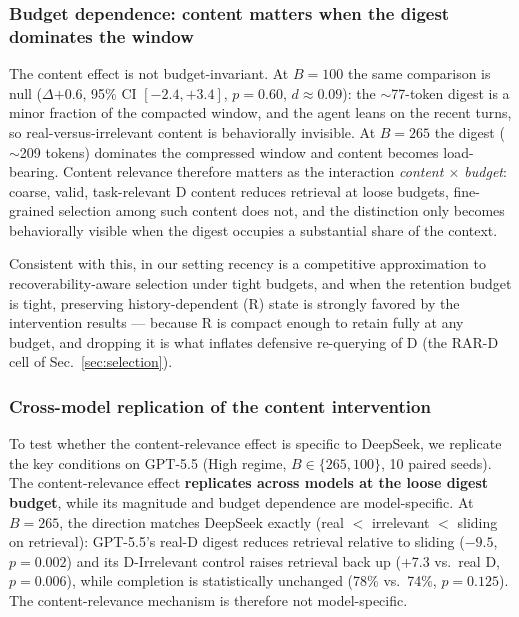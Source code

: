 \documentclass[11pt]{article}
\begin{document}
\subsubsection{Budget dependence: content matters when the digest dominates the window}
\label{sec:budget}

The content effect is not budget-invariant. At $B=100$ the same comparison is
null ($\Delta{+0.6}$, 95\% CI $[-2.4, +3.4]$, $p = 0.60$, $d \approx 0.09$): the $\sim$77-token digest is a
minor fraction of the compacted window, and the agent leans on the recent turns, so
real-versus-irrelevant content is behaviorally invisible. At $B=265$ the digest
($\sim$209 tokens) dominates the compressed window and content becomes load-bearing. Content
relevance therefore matters as the interaction \emph{content $\times$ budget}: coarse, valid,
task-relevant D content reduces retrieval at loose budgets, fine-grained selection among
such content does not, and the distinction only becomes behaviorally visible when the
digest occupies a substantial share of the context.

Consistent with this, in our setting recency is a competitive approximation to
recoverability-aware selection under tight budgets, and when the retention budget is
tight, preserving history-dependent (R) state is strongly favored by the intervention
results --- because R is compact enough to retain fully at any budget, and dropping it is
what inflates defensive re-querying of D (the RAR-D cell of Sec.~\ref{sec:selection}).

\subsubsection{Cross-model replication of the content intervention}
\label{sec:crossmodel}

To test whether the content-relevance effect is specific to DeepSeek, we replicate the
key conditions on GPT-5.5 (High regime, $B \in \{265, 100\}$, 10 paired seeds). The
content-relevance effect \textbf{replicates across models at the loose digest budget}, while
its magnitude and budget dependence are model-specific. At $B=265$, the direction matches
DeepSeek exactly (real $<$ irrelevant $<$ sliding on retrieval): GPT-5.5's real-D digest
reduces retrieval relative to sliding ($-9.5$, $p = 0.002$) and its D-Irrelevant control
raises retrieval back up (+7.3 vs.\ real D, $p = 0.006$), while completion is statistically
unchanged (78\% vs.\ 74\%, $p = 0.125$). The content-relevance mechanism is therefore not
model-specific.
\end{document}
